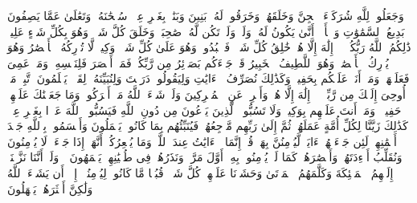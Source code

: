 \stopbuffer%
\startbuffer[\q:6:100]
وَجَعَلُوا۟ لِلَّهِ شُرَكَاۤءَ ٱلۡجِنَّ وَخَلَقَهُمۡۖ وَخَرَقُوا۟ لَهُۥ بَنِینَ وَبَنَٰتِۭ بِغَیۡرِ عِلۡمࣲۚ سُبۡحَٰنَهُۥ وَتَعَٰلَىٰ عَمَّا یَصِفُونَ%
\stopbuffer%
\startbuffer[\q:6:101]
بَدِیعُ ٱلسَّمَٰوَٰتِ وَٱلۡأَرۡضِۖ أَنَّىٰ یَكُونُ لَهُۥ وَلَدࣱ وَلَمۡ تَكُن لَّهُۥ صَٰحِبَةࣱۖ وَخَلَقَ كُلَّ شَیۡءࣲۖ وَهُوَ بِكُلِّ شَیۡءٍ عَلِیمࣱ%
\stopbuffer%
\startbuffer[\q:6:102]
ذَٰلِكُمُ ٱللَّهُ رَبُّكُمۡۖ لَاۤ إِلَٰهَ إِلَّا هُوَۖ خَٰلِقُ كُلِّ شَیۡءࣲ فَٱعۡبُدُوهُۚ وَهُوَ عَلَىٰ كُلِّ شَیۡءࣲ وَكِیلࣱ%
\stopbuffer%
\startbuffer[\q:6:103]
لَّا تُدۡرِكُهُ ٱلۡأَبۡصَٰرُ وَهُوَ یُدۡرِكُ ٱلۡأَبۡصَٰرَۖ وَهُوَ ٱللَّطِیفُ ٱلۡخَبِیرُ%
\stopbuffer%
\startbuffer[\q:6:104]
قَدۡ جَاۤءَكُم بَصَاۤئِرُ مِن رَّبِّكُمۡۖ فَمَنۡ أَبۡصَرَ فَلِنَفۡسِهِۦۖ وَمَنۡ عَمِیَ فَعَلَیۡهَاۚ وَمَاۤ أَنَا۠ عَلَیۡكُم بِحَفِیظࣲ%
\stopbuffer%
\startbuffer[\q:6:105]
وَكَذَٰلِكَ نُصَرِّفُ ٱلۡءَایَٰتِ وَلِیَقُولُوا۟ دَرَسۡتَ وَلِنُبَیِّنَهُۥ لِقَوۡمࣲ یَعۡلَمُونَ%
\stopbuffer%
\startbuffer[\q:6:106]
ٱتَّبِعۡ مَاۤ أُوحِیَ إِلَیۡكَ مِن رَّبِّكَۖ لَاۤ إِلَٰهَ إِلَّا هُوَۖ وَأَعۡرِضۡ عَنِ ٱلۡمُشۡرِكِینَ%
\stopbuffer%
\startbuffer[\q:6:107]
وَلَوۡ شَاۤءَ ٱللَّهُ مَاۤ أَشۡرَكُوا۟ۗ وَمَا جَعَلۡنَٰكَ عَلَیۡهِمۡ حَفِیظࣰاۖ وَمَاۤ أَنتَ عَلَیۡهِم بِوَكِیلࣲ%
\stopbuffer%
\startbuffer[\q:6:108]
وَلَا تَسُبُّوا۟ ٱلَّذِینَ یَدۡعُونَ مِن دُونِ ٱللَّهِ فَیَسُبُّوا۟ ٱللَّهَ عَدۡوَۢا بِغَیۡرِ عِلۡمࣲۗ كَذَٰلِكَ زَیَّنَّا لِكُلِّ أُمَّةٍ عَمَلَهُمۡ ثُمَّ إِلَىٰ رَبِّهِم مَّرۡجِعُهُمۡ فَیُنَبِّئُهُم بِمَا كَانُوا۟ یَعۡمَلُونَ%
\stopbuffer%
\startbuffer[\q:6:109]
وَأَقۡسَمُوا۟ بِٱللَّهِ جَهۡدَ أَیۡمَٰنِهِمۡ لَئِن جَاۤءَتۡهُمۡ ءَایَةࣱ لَّیُؤۡمِنُنَّ بِهَاۚ قُلۡ إِنَّمَا ٱلۡءَایَٰتُ عِندَ ٱللَّهِۖ وَمَا یُشۡعِرُكُمۡ أَنَّهَاۤ إِذَا جَاۤءَتۡ لَا یُؤۡمِنُونَ%
\stopbuffer%
\startbuffer[\q:6:110]
وَنُقَلِّبُ أَفۡءِدَتَهُمۡ وَأَبۡصَٰرَهُمۡ كَمَا لَمۡ یُؤۡمِنُوا۟ بِهِۦۤ أَوَّلَ مَرَّةࣲ وَنَذَرُهُمۡ فِی طُغۡیَٰنِهِمۡ یَعۡمَهُونَ%
\stopbuffer%
\startbuffer[\q:6:111]
۞ وَلَوۡ أَنَّنَا نَزَّلۡنَاۤ إِلَیۡهِمُ ٱلۡمَلَٰۤئِكَةَ وَكَلَّمَهُمُ ٱلۡمَوۡتَىٰ وَحَشَرۡنَا عَلَیۡهِمۡ كُلَّ شَیۡءࣲ قُبُلࣰا مَّا كَانُوا۟ لِیُؤۡمِنُوۤا۟ إِلَّاۤ أَن یَشَاۤءَ ٱللَّهُ وَلَٰكِنَّ أَكۡثَرَهُمۡ یَجۡهَلُونَ%
\stopbuffer%
